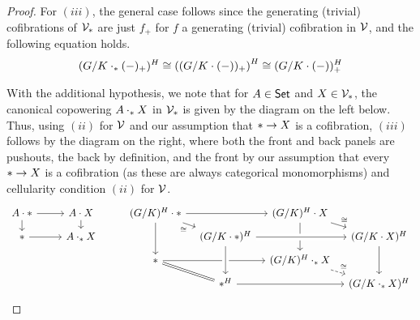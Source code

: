 \documentclass[a4paper,10pt
,draft
]{article}%
\renewcommand{\1}{\eta}%
\begin{document}
\begin{proof}
        For $(iii)$, the general case follows since
        the generating (trivial) cofibrations of $\V_{\**}$ are just $f_+$ for $f$ a generating (trivial) cofibration in $\mathcal V$,
        and the following equation holds.
        \begin{equation}
              (G/K \cdot_{\**} (-)_+)^H \cong \left( (G/K \cdot (-))_+ \right)^H \cong (G/K \cdot (-))^H_+
        \end{equation}

        With the additional hypothesis, we note that for $A \in \mathsf{Set}$ and $X \in \V_{\**}$, the canonical copowering $A \cdot_{\**} X$ in $\V_{\**}$ is given by the diagram on the left below.
        Thus, using $(ii)$ for $\mathcal V$ and our assumption that $\** \to X$ is a cofibration, $(iii)$ follows by the diagram on the right,
        where both the front and back panels are pushouts, the back by definition, and the front by our assumption that every $\** \to X$ is a cofibration (as these are always categorical monomorphisms) and cellularity condition $(ii)$ for $\mathcal V$.      
        \begin{equation}
              \begin{tikzcd}[row sep = tiny]
                    A \cdot \** \arrow[d] \arrow[r]
                    &
                    A \cdot X \arrow[d]
                    & %
                    (G/K)^H \cdot \** \arrow[dd] \arrow[rr] \arrow[dr, "\cong"']
                    &[-15pt]&[-15pt]
                    (G/K)^H \cdot X \arrow[dd] \arrow[dr, "\cong"]
                    \\
                    \** \arrow[r]
                    &
                    A \cdot_{\**} X
                    & %
                    &
                    (G/K \cdot \**)^H \arrow[rr, crossing over]
                    &&[-15pt]
                    (G/K \cdot X)^H \arrow[dd]
                    \\
                    && %
                    \** \arrow[rr] \arrow[dr, equal]
                    &&
                    (G/K)^H \cdot_{\**} X \arrow[dr, dashed, "\cong"]
                    \\
                    && %
                    & \**^H \arrow[rr] \arrow[uu, leftarrow, crossing over]
                    &&
                    (G/K \cdot_{\**} X)^H
              \end{tikzcd}
        \end{equation}
  \end{proof}
\end{document}
